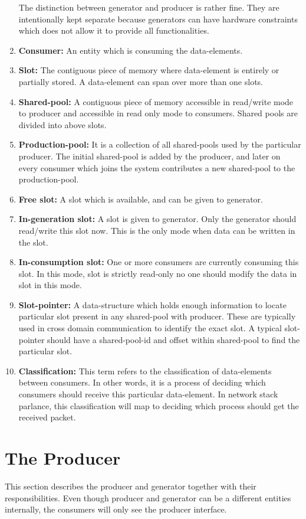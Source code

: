 \documentclass[a4paper,twoside]{report} %
\begin{document}
\begin{enumerate}
  The distinction between generator and producer is
  rather fine.  They are intentionally kept separate because
  generators can have hardware constraints which does not allow
  it to provide all functionalities.
  \item \textbf{Consumer:} An entity which is consuming the data-elements. 
  \item \textbf{Slot:} The contiguous piece of memory where data-element is
  entirely or partially stored. A data-element can span over
  more than one slots. 
  \item \textbf{Shared-pool:} A contiguous piece of memory accessible 
   in read/write mode to producer and accessible in read only mode to 
   consumers.  Shared pools are divided into above slots.
  \item \textbf{Production-pool:} It is a collection of all
  shared-pools used by the particular producer.  The initial
  shared-pool is added by the producer, and later on every consumer
  which joins the system contributes a new shared-pool to the
  production-pool.
  \item \textbf{Free slot:} A slot which is available, and can be given
  to generator.
  \item \textbf{In-generation slot:} A slot is given to generator. Only 
  the generator should read/write this slot now.  This is the only
  mode when data can be written in the slot.
  \item \textbf{In-consumption slot:} One or more consumers are currently
  consuming this slot.  In this mode, slot is strictly read-only
  no one should modify the data in slot in this mode.
  \item \textbf{Slot-pointer:} A data-structure which holds enough
  information to locate particular slot present in any shared-pool
  with producer.  These are typically used in cross domain
  communication to identify the exact slot.  A typical slot-pointer
  should have a shared-pool-id and offset within shared-pool to
  find the particular slot.
  \item \textbf{Classification:} This term refers to the
  classification of data-elements between consumers.  In other words,
  it is a process of deciding which consumers should receive this
  particular data-element.  In network stack parlance, this
  classification will map to deciding which process should get the
  received packet.
\end{enumerate}

\section{The Producer}
This section describes the producer and generator together with
their responsibilities.  Even though producer and generator can
be a different entities internally, the consumers will only see
the producer interface.
\end{document}
